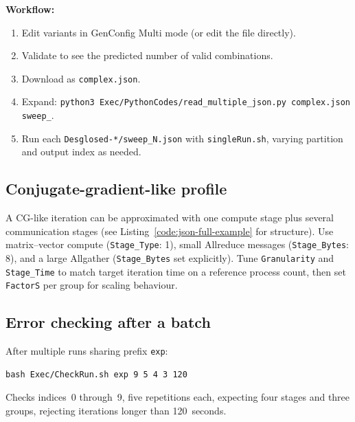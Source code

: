 \textbf{Workflow:}
\begin{enumerate}
  \item Edit variants in GenConfig Multi mode (or edit the file directly).
  \item Validate to see the predicted number of valid combinations.
  \item Download as \texttt{complex.json}.
  \item Expand: \texttt{python3 Exec/PythonCodes/read\_multiple\_json.py complex.json sweep\_}.
  \item Run each \texttt{Desglosed-*/sweep\_N.json} with \texttt{singleRun.sh}, varying partition and output index as needed.
\end{enumerate}

\subsection{Conjugate-gradient-like profile}

A CG-like iteration can be approximated with one compute stage plus several communication stages (see Listing~\ref{code:json-full-example} for structure). Use matrix--vector compute (\texttt{Stage\_Type}: 1), small Allreduce messages (\texttt{Stage\_Bytes}: 8), and a large Allgather (\texttt{Stage\_Bytes} set explicitly). Tune \texttt{Granularity} and \texttt{Stage\_Time} to match target iteration time on a reference process count, then set \texttt{FactorS} per group for scaling behaviour.

\subsection{Error checking after a batch}

After multiple runs sharing prefix \texttt{exp}:

\begin{lstlisting}[style=bashstyle]
bash Exec/CheckRun.sh exp 9 5 4 3 120
\end{lstlisting}

Checks indices~0 through~9, five repetitions each, expecting four stages and three groups, rejecting iterations longer than 120~seconds.

